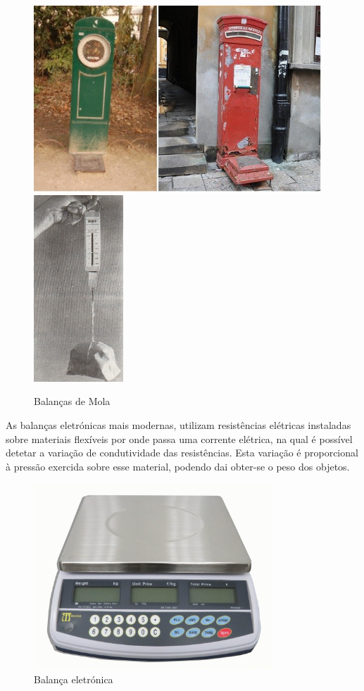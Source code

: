 \begin{minipage}[!b]{\linewidth}
	\begin{figure}[H]
		\captionsetup{justification=raggedright,singlelinecheck=false}
		\flushleft
		\includegraphics[height=7cm]{./image/PESTA/general/Public_Body_Scales_1.jpg}
		\hspace{.8cm}
		\includegraphics[height=7cm]{./image/PESTA/general/Balanca_Mola_1.jpg}
		\caption{Balanças de Mola}
		\label{Balanca_Mola_1}
	\end{figure}
\end{minipage}
As balanças eletrónicas mais modernas, utilizam resistências elétricas instaladas sobre materiais flexíveis por onde passa uma corrente elétrica, na qual é possível detetar a variação de condutividade das resistências. Esta variação é proporcional à pressão exercida sobre esse material, podendo dai obter-se o peso dos objetos.
\\
\begin{figure}[H]
	\centering
	\includegraphics[height=7cm]{./image/PESTA/general/Scale_1.jpg}
	\caption{Balança eletrónica}
	\label{Scale_1}
\end{figure}
